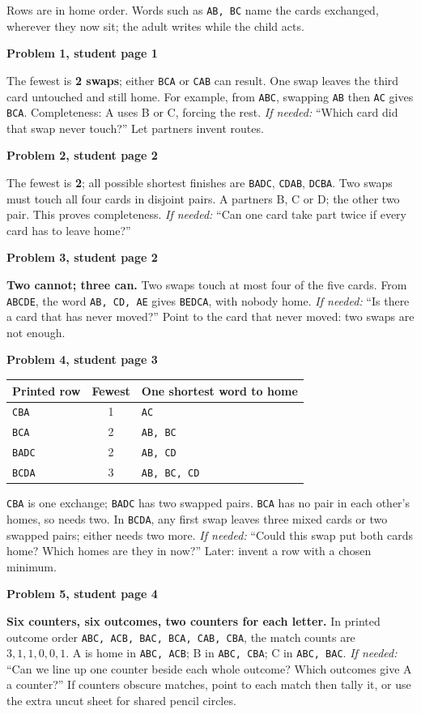 \documentclass[11pt]{article}
\newcommand{\sub}[1]{\par\textbf{#1}\par}
\newcommand{\row}[1]{\texttt{#1}}
\newcommand{\hint}[1]{\emph{If needed:} #1}
\begin{document}
Rows are in home order. Words such as \row{AB, BC} name the cards exchanged, wherever they now sit; the adult writes while the child acts.

\sub{Problem 1, student page 1}
The fewest is \textbf{2 swaps}; either \row{BCA} or \row{CAB} can result. One swap leaves the third card untouched and still home. For example, from \row{ABC}, swapping \row{AB} then \row{AC} gives \row{BCA}. Completeness: A uses B or C, forcing the rest. \hint{``Which card did that swap never touch?''} Let partners invent routes.

\sub{Problem 2, student page 2}
The fewest is \textbf{2}; all possible shortest finishes are \row{BADC}, \row{CDAB}, \row{DCBA}. Two swaps must touch all four cards in disjoint pairs. A partners B, C or D; the other two pair. This proves completeness. \hint{``Can one card take part twice if every card has to leave home?''}

\sub{Problem 3, student page 2}
\textbf{Two cannot; three can.} Two swaps touch at most four of the five cards. From \row{ABCDE}, the word \row{AB, CD, AE} gives \row{BEDCA}, with nobody home. \hint{``Is there a card that has never moved?''} Point to the card that never moved: two swaps are not enough.

\sub{Problem 4, student page 3}
\begin{center}\renewcommand{\arraystretch}{1.15}
\begin{tabular}{lcl}
Printed row & Fewest & One shortest word to home\\\midrule
\row{CBA} & 1 & \row{AC}\\
\row{BCA} & 2 & \row{AB, BC}\\
\row{BADC} & 2 & \row{AB, CD}\\
\row{BCDA} & 3 & \row{AB, BC, CD}
\end{tabular}
\end{center}
\row{CBA} is one exchange; \row{BADC} has two swapped pairs. \row{BCA} has no pair in each other's homes, so needs two. In \row{BCDA}, any first swap leaves three mixed cards or two swapped pairs; either needs two more. \hint{``Could this swap put both cards home? Which homes are they in now?''} Later: invent a row with a chosen minimum.

\sub{Problem 5, student page 4}
\textbf{Six counters, six outcomes, two counters for each letter.} In printed outcome order \row{ABC, ACB, BAC, BCA, CAB, CBA}, the match counts are $3,1,1,0,0,1$. A is home in \row{ABC, ACB}; B in \row{ABC, CBA}; C in \row{ABC, BAC}. \hint{``Can we line up one counter beside each whole outcome? Which outcomes give A a counter?''} If counters obscure matches, point to each match then tally it, or use the extra uncut sheet for shared pencil circles.
\end{document}
